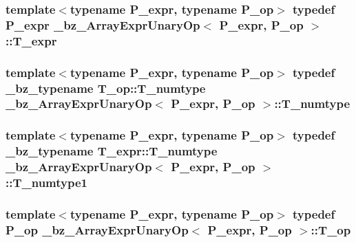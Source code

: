 \subsubsection[{T\+\_\+expr}]{\setlength{\rightskip}{0pt plus 5cm}template$<$typename P\+\_\+expr, typename P\+\_\+op$>$ typedef P\+\_\+expr {\bf \+\_\+bz\+\_\+\+Array\+Expr\+Unary\+Op}$<$ P\+\_\+expr, P\+\_\+op $>$\+::{\bf T\+\_\+expr}}\label{class__bz__ArrayExprUnaryOp_aa7e8d93e795781e0f9bed0120b380365}
\hypertarget{class__bz__ArrayExprUnaryOp_a89bf264c814e1fa55026c4389ad34085}{}
\subsubsection[{T\+\_\+numtype}]{\setlength{\rightskip}{0pt plus 5cm}template$<$typename P\+\_\+expr, typename P\+\_\+op$>$ typedef {\bf \+\_\+bz\+\_\+typename} T\+\_\+op\+::\+T\+\_\+numtype {\bf \+\_\+bz\+\_\+\+Array\+Expr\+Unary\+Op}$<$ P\+\_\+expr, P\+\_\+op $>$\+::{\bf T\+\_\+numtype}}\label{class__bz__ArrayExprUnaryOp_a89bf264c814e1fa55026c4389ad34085}
\hypertarget{class__bz__ArrayExprUnaryOp_a5639f61afc3875934b57d495a4b95faf}{}
\subsubsection[{T\+\_\+numtype1}]{\setlength{\rightskip}{0pt plus 5cm}template$<$typename P\+\_\+expr, typename P\+\_\+op$>$ typedef {\bf \+\_\+bz\+\_\+typename} T\+\_\+expr\+::\+T\+\_\+numtype {\bf \+\_\+bz\+\_\+\+Array\+Expr\+Unary\+Op}$<$ P\+\_\+expr, P\+\_\+op $>$\+::{\bf T\+\_\+numtype1}}\label{class__bz__ArrayExprUnaryOp_a5639f61afc3875934b57d495a4b95faf}
\hypertarget{class__bz__ArrayExprUnaryOp_a3d3a509583d155eab8772ca247985bc7}{}
\subsubsection[{T\+\_\+op}]{\setlength{\rightskip}{0pt plus 5cm}template$<$typename P\+\_\+expr, typename P\+\_\+op$>$ typedef P\+\_\+op {\bf \+\_\+bz\+\_\+\+Array\+Expr\+Unary\+Op}$<$ P\+\_\+expr, P\+\_\+op $>$\+::{\bf T\+\_\+op}}\label{class__bz__ArrayExprUnaryOp_a3d3a509583d155eab8772ca247985bc7}


